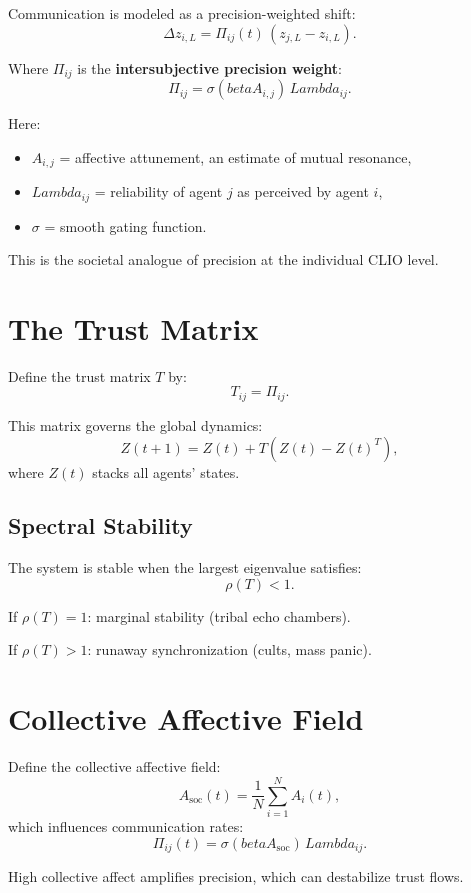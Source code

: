 \documentclass[12pt,oneside]{book}
\theoremstyle{plain}
\theoremstyle{definition}
\def\beta{beta}%
\def\Lambda{Lambda}%
\begin{document}
Communication is modeled as a precision-weighted shift:
\[
\Delta z_{i,L}
= \Pi_{ij}(t)\, (z_{j,L} - z_{i,L}).
\]

Where $\Pi_{ij}$ is the \textbf{intersubjective precision weight}:
\[
\Pi_{ij}
= \sigma(\beta A_{i,j})
\, \Lambda_{ij}.
\]

Here:

\begin{itemize}
  \item $A_{i,j}$ = affective attunement, an estimate of mutual resonance,
  \item $\Lambda_{ij}$ = reliability of agent $j$ as perceived by agent $i$,
  \item $\sigma$ = smooth gating function.
\end{itemize}

This is the societal analogue of precision at the individual CLIO level.

\section{The Trust Matrix}

Define the trust matrix $T$ by:
\[
T_{ij} = \Pi_{ij}.
\]

This matrix governs the global dynamics:
\[
Z(t+1) = Z(t) + T (Z(t) - Z(t)^T),
\]
where $Z(t)$ stacks all agents' states.

\subsection{Spectral Stability}

The system is stable when the largest eigenvalue satisfies:
\[
\rho(T) < 1.
\]

If $\rho(T) = 1$:
\quad marginal stability (tribal echo chambers).

If $\rho(T) > 1$:
\quad runaway synchronization (cults, mass panic).

\section{Collective Affective Field}

Define the collective affective field:
\[
A_{\mathrm{soc}}(t)
= \frac{1}{N} \sum_{i=1}^{N} A_i(t),
\]
which influences communication rates:
\[
\Pi_{ij}(t) = \sigma(\beta A_{\mathrm{soc}})\, \Lambda_{ij}.
\]

High collective affect amplifies precision, which can destabilize trust flows.
\end{document}
